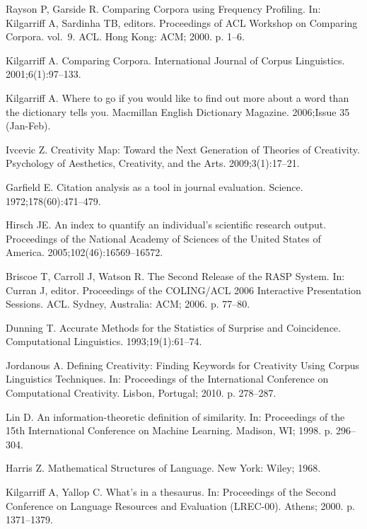 \documentclass[10pt,letterpaper]{article}
\begin{document}
\begin{thebibliography}{10}
Rayson P, Garside R.
\newblock Comparing Corpora using Frequency Profiling.
\newblock In: Kilgarriff A, Sardinha TB, editors. Proceedings of ACL Workshop
  on Comparing Corpora. vol.~9. ACL. Hong Kong: ACM; 2000. p. 1--6.

Kilgarriff A.
\newblock Comparing Corpora.
\newblock International Journal of Corpus Linguistics. 2001;6(1):97--133.

Kilgarriff A.
\newblock Where to go if you would like to find out more about a word than the
  dictionary tells you.
\newblock Macmillan English Dictionary Magazine. 2006;Issue 35 (Jan-Feb).

Ivcevic Z.
\newblock Creativity Map: Toward the Next Generation of Theories of Creativity.
\newblock Psychology of Aesthetics, Creativity, and the Arts. 2009;3(1):17--21.

Garfield E.
\newblock Citation analysis as a tool in journal evaluation.
\newblock Science. 1972;178(60):471--479.

Hirsch JE.
\newblock An index to quantify an individual's scientific research output.
\newblock Proceedings of the National Academy of Sciences of the United States
  of America. 2005;102(46):16569--16572.

Briscoe T, Carroll J, Watson R.
\newblock The Second Release of the {RASP} System.
\newblock In: Curran J, editor. Proceedings of the COLING/ACL 2006 Interactive
  Presentation Sessions. ACL. Sydney, Australia: ACM; 2006. p. 77--80.

Dunning T.
\newblock Accurate Methods for the Statistics of Surprise and Coincidence.
\newblock Computational Linguistics. 1993;19(1):61--74.

Jordanous A.
\newblock Defining Creativity: Finding Keywords for Creativity Using Corpus
  Linguistics Techniques.
\newblock In: Proceedings of the International Conference on Computational
  Creativity. Lisbon, Portugal; 2010. p. 278--287.

Lin D.
\newblock An information-theoretic definition of similarity.
\newblock In: Proceedings of the 15th International Conference on Machine
  Learning. Madison, WI; 1998. p. 296--304.

Harris Z.
\newblock Mathematical Structures of Language.
\newblock New York: Wiley; 1968.

Kilgarriff A, Yallop C.
\newblock What's in a thesaurus.
\newblock In: Proceedings of the Second Conference on Language Resources and
  Evaluation (LREC-00). Athens; 2000. p. 1371--1379.


\end{thebibliography}
\end{document}
